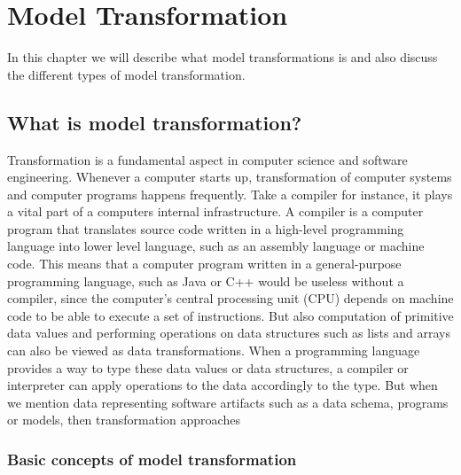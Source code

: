
\chapter{Model Transformation} %

\label{Chapte3} %


In this chapter we will describe what model transformations is and also discuss
the different types of model transformation.

\section{What is model transformation?}

Transformation is a fundamental aspect in computer science and software
engineering. Whenever a computer starts up, transformation of computer systems
and computer programs happens frequently. Take a compiler for instance, it plays
a vital part of a computers internal infrastructure. A compiler is a computer
program that translates source code written in a high-level programming
language into lower level language, such as an assembly language or machine
code. This means that a computer program written in a general-purpose
programming language, such as Java or C++ would be useless without a compiler,
since the computer's central processing unit (CPU) depends on machine code to be
able to execute a set of instructions. But also computation of primitive data
values and performing operations on data structures such as lists and arrays can
also be viewed as data transformations. When a programming language provides a way
to type these data values or data structures, a compiler or interpreter can
apply operations to the data accordingly to the type. But when we mention
data representing software artifacts such as a data schema, programs or models,
then transformation approaches 

\subsection{Basic concepts of model transformation}

